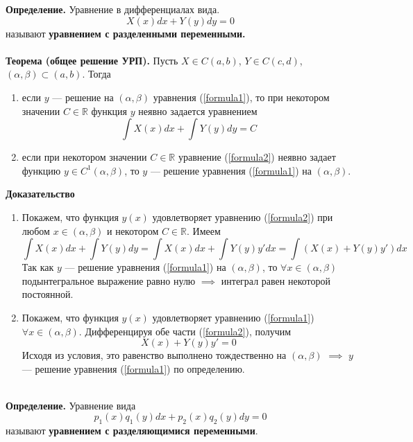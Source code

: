 \textbf{Определение.} Уравнение в дифференциалах вида.
\begin{equation}
  X(x)dx + Y(y)dy = 0 \label{formula1}
\end{equation}
называют \textbf{уравнением с разделенными переменными.}\\
\\
\textbf{Теорема (общее решение УРП).} Пусть $X \in C(a,b)$, $Y \in C(c,d)$, $(\alpha, \beta) \subset (a,b)$. Тогда
\begin{enumerate}
    \item если $y$ --- решение на $(\alpha, \beta)$ уравнения (\ref{formula1}), то при некотором значении $C \in \mathbb{R}$ функция $y$ неявно задается уравнением
    \begin{equation}
        \int X(x)dx + \int Y(y)dy = C \label{formula2}
    \end{equation}
    \item если при некотором значении $C \in \mathbb{R}$ уравнение (\ref{formula2}) неявно задает функцию $y \in C^1(\alpha, \beta)$, то $y$ --- решение уравнения (\ref{formula1}) на $(\alpha, \beta)$. 
\end{enumerate}
\textbf{Доказательство}
\begin{enumerate}
    \item Покажем, что функция $y(x)$ удовлетворяет уравнению (\ref{formula2}) при любом $x \in (\alpha, \beta)$ и некотором $C \in \mathbb{R}$. Имеем
    \begin{equation*}
        \int X(x)dx + \int Y(y)dy = \int X(x)dx + \int Y(y)y'dx = \int (X(x) + Y(y)y')dx
    \end{equation*}
    Так как $y$ --- решение уравнения (\ref{formula1}) на $(\alpha, \beta)$, то $\forall x \in (\alpha, \beta)$ подынтегральное выражение равно нулю $\implies$ интеграл равен некоторой постоянной.
    \item Покажем, что функция $y(x)$ удовлетворяет уравнению (\ref{formula1}) $\forall x \in (\alpha, \beta)$. Дифференцируя обе части (\ref{formula2}), получим
    \begin{equation*}
        X(x) + Y(y)y' = 0
    \end{equation*}
    Исходя из условия, это равенство выполнено тождественно на $(\alpha, \beta)$ $\implies$ $y$ --- решение уравнения (\ref{formula1}) по определению.
\end{enumerate}
\\
\textbf{Определение.} Уравнение вида
\begin{equation}
    p_1(x)q_1(y)dx + p_2(x)q_2(y)dy = 0 \label{formula3}
\end{equation}
называют \textbf{уравнением с разделяющимися переменными}.\\

